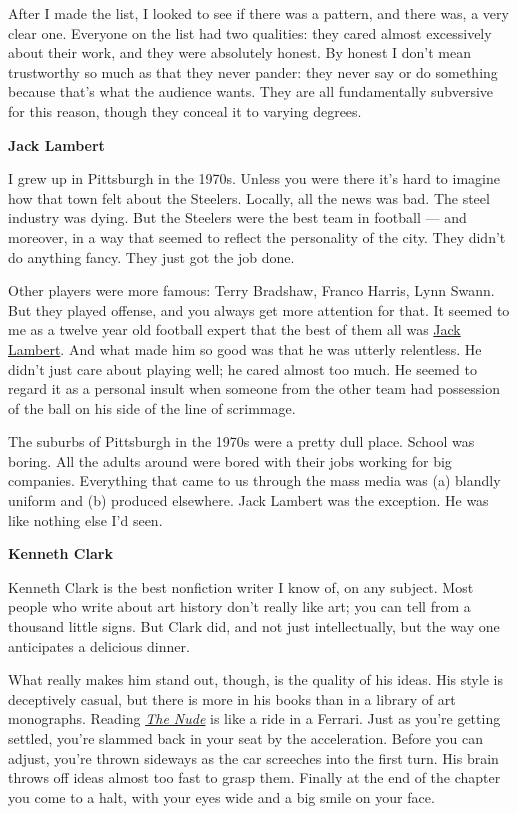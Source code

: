 \documentclass[12pt]{book}
\begin{document}
After I made the list, I looked to see if there was a pattern, and there
was, a very clear one. Everyone on the list had two qualities: they
cared almost excessively about their work, and they were absolutely
honest. By honest I don't mean trustworthy so much as that they never
pander: they never say or do something because that's what the audience
wants. They are all fundamentally subversive for this reason, though
they conceal it to varying degrees.

\textbf{Jack Lambert}

I grew up in Pittsburgh in the 1970s. Unless you were there it's hard to
imagine how that town felt about the Steelers. Locally, all the news was
bad. The steel industry was dying. But the Steelers were the best team
in football --- and moreover, in a way that seemed to reflect the
personality of the city. They didn't do anything fancy. They just got
the job done.

Other players were more famous: Terry Bradshaw, Franco Harris, Lynn
Swann. But they played offense, and you always get more attention for
that. It seemed to me as a twelve year old football expert that the best
of them all was
\href{http://en.wikipedia.org/wiki/Jack_Lambert_(American_football_player)}{Jack
Lambert}. And what made him so good was that he was utterly relentless.
He didn't just care about playing well; he cared almost too much. He
seemed to regard it as a personal insult when someone from the other
team had possession of the ball on his side of the line of scrimmage.

The suburbs of Pittsburgh in the 1970s were a pretty dull place. School
was boring. All the adults around were bored with their jobs working for
big companies. Everything that came to us through the mass media was (a)
blandly uniform and (b) produced elsewhere. Jack Lambert was the
exception. He was like nothing else I'd seen.

\textbf{Kenneth Clark}

Kenneth Clark is the best nonfiction writer I know of, on any subject.
Most people who write about art history don't really like art; you can
tell from a thousand little signs. But Clark did, and not just
intellectually, but the way one anticipates a delicious dinner.

What really makes him stand out, though, is the quality of his ideas.
His style is deceptively casual, but there is more in his books than in
a library of art monographs. Reading
\href{http://www.amazon.com/Nude-Study-Ideal-Form/dp/0691017883}{\emph{The
Nude}} is like a ride in a Ferrari. Just as you're getting settled,
you're slammed back in your seat by the acceleration. Before you can
adjust, you're thrown sideways as the car screeches into the first turn.
His brain throws off ideas almost too fast to grasp them. Finally at the
end of the chapter you come to a halt, with your eyes wide and a big
smile on your face.
\end{document}
